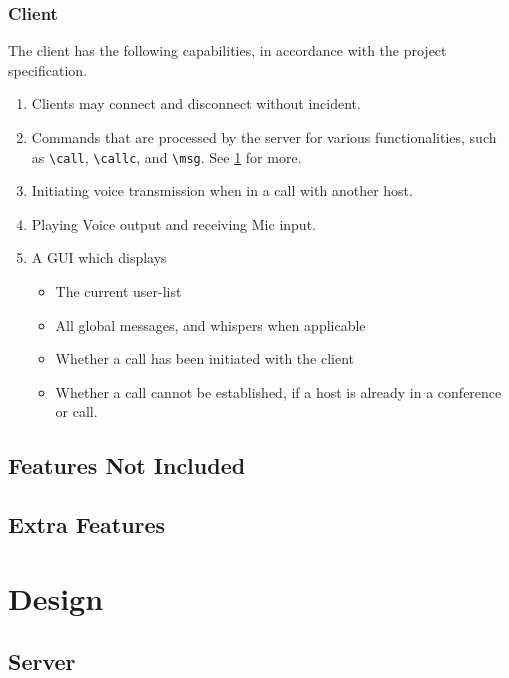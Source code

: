 \documentclass[10pt,a4paper]{article}
\begin{document}
\subsubsection{Client}
The client has the following capabilities, in accordance with the project specification.

\begin{enumerate}
 \item Clients may connect and disconnect without incident.
 \item Commands that are processed by the server for various functionalities, such as \verb|\call|, \verb|\callc|, and \verb|\msg|. See \ref{det} for more.
 \item Initiating voice transmission when in a call with another host.
 \item Playing Voice output and receiving Mic input.
 \item A GUI which displays
 \begin{itemize}
  \item The current user-list
  \item All global messages, and whispers when applicable
  \item Whether a call has been initiated with the client
  \item Whether a call cannot be established, if a host is already in a conference or call.
 \end{itemize}

\end{enumerate}

\subsection{Features Not Included}
\paragraph{}

\subsection{Extra Features}

\section{Design}
\label{det}
\subsection{Server}
%
\end{document}
